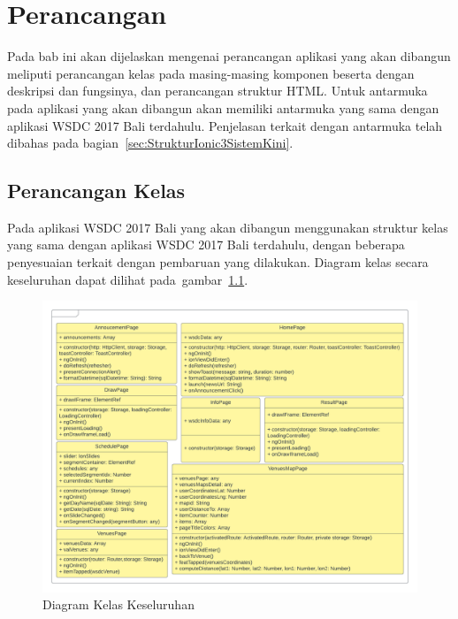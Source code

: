 \chapter{Perancangan}
\label{chap:perancangan}

Pada bab ini akan dijelaskan mengenai perancangan aplikasi yang akan dibangun meliputi perancangan kelas pada masing-masing komponen beserta dengan deskripsi dan fungsinya, dan perancangan struktur HTML. Untuk antarmuka pada aplikasi yang akan dibangun akan memiliki antarmuka yang sama dengan aplikasi WSDC 2017 Bali terdahulu. Penjelasan terkait dengan antarmuka telah dibahas pada bagian~\ref{sec:StrukturIonic3SistemKini}. 

\section{Perancangan Kelas}
\label{sec:perancanganKelas}

Pada aplikasi WSDC 2017 Bali yang akan dibangun menggunakan struktur kelas yang sama dengan aplikasi WSDC 2017 Bali terdahulu, dengan beberapa penyesuaian terkait dengan pembaruan yang dilakukan. Diagram kelas secara keseluruhan dapat dilihat pada~gambar~\ref{fig:umldiagramkeseluruhan}.

\begin{figure}[H]
    \centering
    \includegraphics[scale=0.25]{Gambar/umldiagram.png}
    \caption{ Diagram Kelas Keseluruhan}
    \label{fig:umldiagramkeseluruhan}
\end{figure}

\newpage

